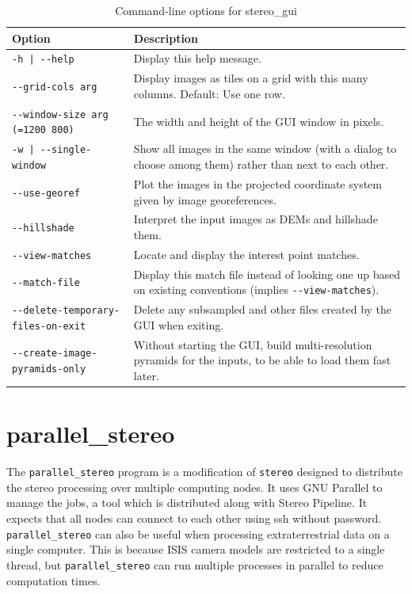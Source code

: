 \begin{longtable}{|l|p{7.5cm}|}
\caption{Command-line options for stereo\_gui}
\label{tbl:stereogui}
\endfirsthead
\endhead
\endfoot
\endlastfoot
\hline
Option & Description \\ \hline \hline
\texttt{-h | -\/-help } & Display this help message.\\ \hline
\texttt{-\/-grid-cols arg} & Display images as tiles on a grid with this many columns. Default: Use one row.\\ \hline
\texttt{-\/-window-size arg (=1200 800)} & The width and height of the GUI window in pixels.\\ \hline
\texttt{-w | -\/-single-window } & Show all images in the same window (with a dialog to choose among them) rather than next to each other.\\ \hline
\texttt{-\/-use-georef} & Plot the images in the projected coordinate system given by image georeferences.\\ \hline
\texttt{-\/-hillshade} & Interpret the input images as DEMs and hillshade them.\\ \hline
\texttt{-\/-view-matches} & Locate and display the interest point matches.\\ \hline
\texttt{-\/-match-file} & Display this match file instead of looking one up based on existing conventions (implies \texttt{-\/-view-matches}). \\ \hline
\texttt{-\/-delete-temporary-files-on-exit} & Delete any subsampled and other files created by the GUI when exiting.\\ \hline
\texttt{-\/-create-image-pyramids-only} & Without starting the GUI, build multi-resolution pyramids for the inputs, to be able to load them fast later.\\ \hline
\end{longtable}

\section{parallel\_stereo}
\label{parallel}

The \texttt{parallel\_stereo} program is a modification of
\texttt{stereo} designed to distribute the stereo processing over
multiple computing nodes. It uses GNU Parallel to manage the jobs, a tool which
is distributed along with Stereo Pipeline. It expects that all nodes
can connect to each other using ssh without password. \texttt{parallel\_stereo}
can also be useful when processing extraterrestrial data on a single computer.
This is because ISIS camera models are restricted to a single thread, but
\texttt{parallel\_stereo} can run multiple processes in parallel to reduce
computation times.

